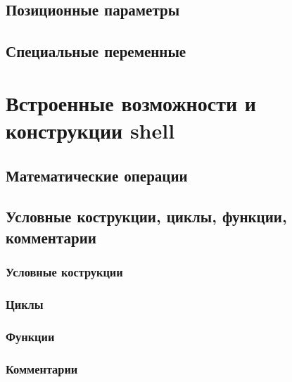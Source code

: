 \documentclass[oneside]{book}
\begin{document}
      \section{Позиционные параметры}
      

      \section{Специальные переменные}
      

   \chapter{Встроенные возможности и конструкции shell}
   

      \section{Математические операции}
      

      \section{Условные кострукции, циклы, функции, комментарии}

         \subsection{Условные кострукции}
         

         \subsection{Циклы}
         

         \subsection{Функции}
         

         \subsection{Комментарии}
         
\end{document}
